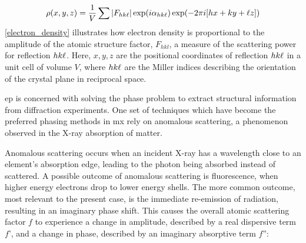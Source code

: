


\begin{equation}
    \rho(x,y,z)=\frac{1}{V} \sum |F_{hk\ell}| \exp(i\alpha_{hk\ell}) \exp(-2\pi i [hx+ky+\ell z]) \label{electron_density}
\end{equation}
\cref{electron_density} illustrates how electron density is proportional to the amplitude of the atomic structure factor, $F_{hkl}$, a measure of the scattering power for reflection $hk\ell$. Here, $x,y,z$ are the positional coordinates of reflection $hk\ell$ in a unit cell of volume $V$, where $hk\ell$ are the Miller indices describing the orientation of the crystal plane in reciprocal space. %

\ac{ep} is concerned with solving the phase problem to extract structural information from diffraction experiments. One set of techniques which have become the preferred phasing methods in \ac{mx} rely on anomalous scattering, a phenomenon observed in the X-ray absorption of matter.

Anomalous scattering occurs when an incident X-ray has a wavelength close to an element’s absorption edge, leading to the photon being absorbed instead of scattered. A possible outcome of anomalous scattering is fluorescence, when higher energy electrons drop to lower energy shells. The more common outcome, most relevant to the present case, is the immediate re-emission of radiation, resulting in an imaginary phase shift. This causes the overall atomic scattering factor $f$ to experience a change in amplitude, described by a real dispersive term $f’$, and a change in phase, described by an imaginary absorptive term $f”$:

